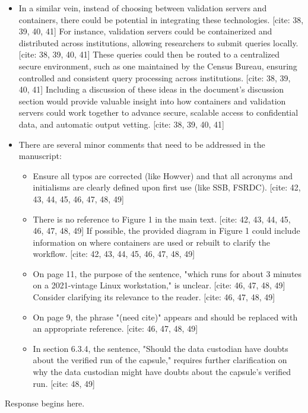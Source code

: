 \begin{referee}
\begin{itemize}
    \item In a similar vein, instead of choosing between validation servers and containers, there could be potential in integrating these technologies. [cite: 38, 39, 40, 41] For instance, validation servers could be containerized and distributed across institutions, allowing researchers to submit queries locally. [cite: 38, 39, 40, 41] These queries could then be routed to a centralized secure environment, such as one maintained by the Census Bureau, ensuring controlled and consistent query processing across institutions. [cite: 38, 39, 40, 41] Including a discussion of these ideas in the document's discussion section would provide valuable insight into how containers and validation servers could work together to advance secure, scalable access to confidential data, and automatic output vetting. [cite: 38, 39, 40, 41]
    \item There are several minor comments that need to be addressed in the manuscript:
    \begin{itemize}
        \item Ensure all typos are corrected (like Howver) and that all acronyms and initialisms are clearly defined upon first use (like SSB, FSRDC). [cite: 42, 43, 44, 45, 46, 47, 48, 49]
        \item There is no reference to Figure 1 in the main text. [cite: 42, 43, 44, 45, 46, 47, 48, 49] If possible, the provided diagram in Figure 1 could include information on where containers are used or rebuilt to clarify the workflow. [cite: 42, 43, 44, 45, 46, 47, 48, 49]
        \item On page 11, the purpose of the sentence, "which runs for about 3 minutes on a 2021-vintage Linux workstation," is unclear. [cite: 46, 47, 48, 49] Consider clarifying its relevance to the reader. [cite: 46, 47, 48, 49]
        \item On page 9, the phrase "(need cite)" appears and should be replaced with an appropriate reference. [cite: 46, 47, 48, 49]
         \item In section 6.3.4, the sentence, "Should the data custodian have doubts about the verified run of the capsule," requires further clarification on why the data custodian might have doubts about the capsule's verified run. [cite: 48, 49]
    \end{itemize}
\end{itemize}

\end{referee}

\begin{response}
    Response begins here.
\end{response}

